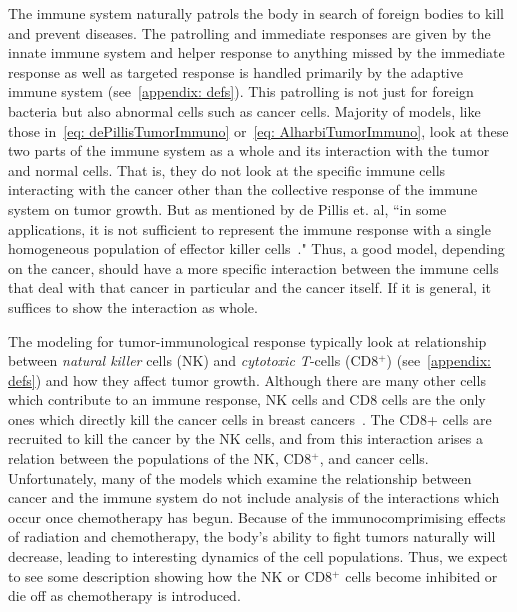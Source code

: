 \documentclass[11pt]{amsart}
\begin{document}
The immune system naturally patrols the body in search of foreign bodies to kill and prevent diseases.
The patrolling and immediate responses are given by the innate immune system and helper response to anything missed by the immediate response as well as targeted response is handled primarily by the adaptive immune system (see\ \ref{appendix: defs}).
This patrolling is not just for foreign bacteria but also abnormal cells such as cancer cells. 
Majority of models, like those in\ \ref{eq: dePillisTumorImmuno} or\ \ref{eq: AlharbiTumorImmuno}, look at these two parts of the immune system as  a whole and its interaction with the tumor and normal cells.
That is, they do not look at the specific immune cells interacting with the cancer other than the collective response of the immune system on tumor growth.
But as mentioned by de Pillis et. al, ``in some applications, it is not sufficient to represent the immune response with a single homogeneous population of
effector killer cells\ \cite{dePillis2014461}."
Thus, a good model, depending on the cancer, should have a more specific interaction between the immune cells that deal with that cancer in particular and the cancer itself.
If it is general, it suffices to show the interaction as whole.

The modeling for tumor-immunological response typically look at relationship between \textit{natural killer} cells (NK) and \textit{cytotoxic T}-cells (CD8$^+$) (see\ \ref{appendix: defs}) and how they affect tumor growth.
Although there are many other cells which contribute to an immune response, NK cells and CD8 cells are the only ones which directly kill the cancer cells in breast cancers\ \cite{Amens21}.
The CD8+ cells are recruited to kill the cancer by the NK cells, and from this interaction arises a relation between the populations of the NK, CD8$^+$, and cancer cells. 
Unfortunately, many of the models which examine the relationship between cancer and the immune system do not include analysis of the interactions which occur once chemotherapy has begun.
Because of the immunocomprimising effects of radiation and chemotherapy, the body's ability to fight tumors naturally will decrease, leading to interesting dynamics of the cell populations.
Thus, we expect to see some description showing how the NK or CD8$^+$ cells become inhibited or die off as chemotherapy is introduced.
\end{document}
